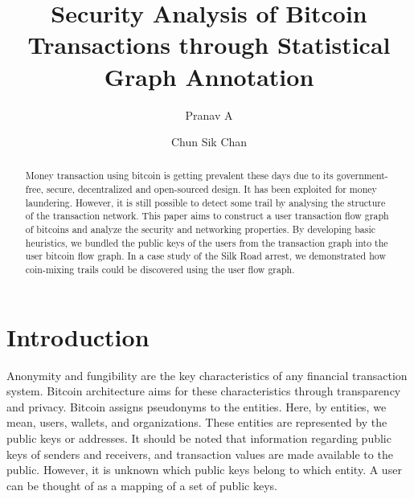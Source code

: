 \documentclass[runningheads,a4paper]{llncs}[2017/09/04]
\begin{document}
\title{Security Analysis of Bitcoin Transactions through Statistical Graph Annotation}
{}

\author{Pranav A \and Chun Sik Chan}

%
%

\maketitle

\begin{abstract}
  Money transaction using bitcoin is getting prevalent these days due
  to its government-free, secure, decentralized and open-sourced design. It has been exploited for money laundering. However, it is still possible to detect some trail by analysing the structure of the transaction network. This paper aims to construct a user transaction flow graph of bitcoins and analyze the security and networking properties.
  By developing basic heuristics, we bundled the public keys of the users
  from the transaction graph into the user bitcoin flow graph. In a case study of the Silk Road arrest, we demonstrated how coin-mixing trails could be discovered using the user flow graph.
\end{abstract}

\section{Introduction}

Anonymity and fungibility are the key characteristics of any financial transaction system. Bitcoin architecture aims for these characteristics through transparency and privacy. Bitcoin assigns pseudonyms to the entities. Here, by entities, we mean, users, wallets, and organizations. These entities are represented by the public keys or addresses. It should be noted that information regarding public keys of senders and receivers, and transaction values are made available to the public. However, it is unknown which public keys belong to which entity. A user can be thought of as a mapping of a set of public keys.
 
\end{document}

